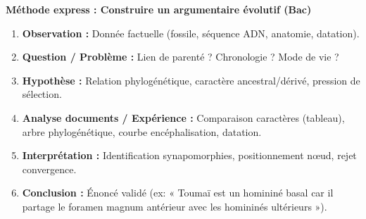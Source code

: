 \documentclass[11pt]{article}
\begin{document}
\begin{bilan}
\textbf{Méthode express : Construire un argumentaire évolutif (Bac)}
\begin{enumerate}
    \item \textbf{Observation :} Donnée factuelle (fossile, séquence ADN, anatomie, datation).
    \item \textbf{Question / Problème :} Lien de parenté ? Chronologie ? Mode de vie ?
    \item \textbf{Hypothèse :} Relation phylogénétique, caractère ancestral/dérivé, pression de sélection.
    \item \textbf{Analyse documents / Expérience :} Comparaison caractères (tableau), arbre phylogénétique, courbe encéphalisation, datation.
    \item \textbf{Interprétation :} Identification synapomorphies, positionnement nœud, rejet convergence.
    \item \textbf{Conclusion :} Énoncé validé (ex: « Toumaï est un homininé basal car il partage le foramen magnum antérieur avec les homininés ultérieurs »).
\end{enumerate}

\end{bilan}
\end{document}
